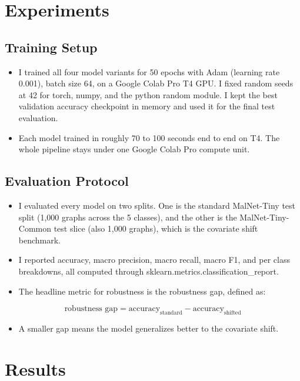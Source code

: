 \documentclass[12pt]{article}
\begin{document}
\section{Experiments}

\subsection{Training Setup}

\begin{itemize}
    \item I trained all four model variants for 50 epochs with Adam (learning rate 0.001), batch size 64, on a Google Colab Pro T4 GPU. I fixed random seeds at 42 for torch, numpy, and the python random module. I kept the best validation accuracy checkpoint in memory and used it for the final test evaluation.
    \item Each model trained in roughly 70 to 100 seconds end to end on T4. The whole pipeline stays under one Google Colab Pro compute unit.
\end{itemize}

\subsection{Evaluation Protocol}

\begin{itemize}
    \item I evaluated every model on two splits. One is the standard MalNet-Tiny test split (1,000 graphs across the 5 classes), and the other is the MalNet-Tiny-Common test slice (also 1,000 graphs), which is the covariate shift benchmark.
    \item I reported accuracy, macro precision, macro recall, macro F1, and per class breakdowns, all computed through sklearn.metrics.classification\_report.
    \item The headline metric for robustness is the robustness gap, defined as:
\end{itemize}

\[
\text{robustness gap} = \text{accuracy}_{\text{standard}} - \text{accuracy}_{\text{shifted}}
\]

\begin{itemize}
    \item A smaller gap means the model generalizes better to the covariate shift.
\end{itemize}

\section{Results}
\end{document}
